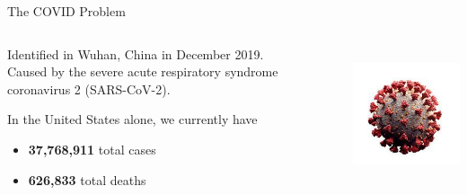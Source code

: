\begin{slide}{The COVID Problem}
	\centering
	\begin{columns}[T]
		\begin{column}{.6\textwidth}
			Identified in Wuhan, China in December 2019. \\
	
			Caused by the severe acute respiratory syndrome coronavirus 2 (SARS-CoV-2). 
	
			\vspace{1cm}
	
			In the United States alone, we currently have
			\begin{itemize}
				\item \textbf{37,768,911} total cases
				\item \textbf{626,833} total deaths
			\end{itemize}
		\end{column}
		\begin{column}{.2\textwidth}
			\includegraphics[height=4cm]{images/covid}
		\end{column}
	\end{columns}
\end{slide}